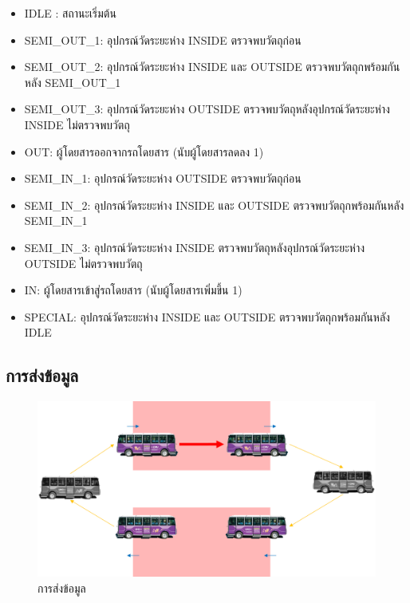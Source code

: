 \begin{itemize}
  \item IDLE : สถานะเริ่มต้น
  \item SEMI\_OUT\_1: อุปกรณ์วัดระยะห่าง INSIDE ตรวจพบวัตถุก่อน
  \item SEMI\_OUT\_2: อุปกรณ์วัดระยะห่าง INSIDE และ OUTSIDE ตรวจพบวัตถุกพร้อมกันหลัง SEMI\_OUT\_1
  \item SEMI\_OUT\_3: อุปกรณ์วัดระยะห่าง OUTSIDE ตรวจพบวัตถุหลังอุปกรณ์วัดระยะห่าง INSIDE ไม่ตรวจพบวัตถุ
  \item OUT: ผู้โดยสารออกจากรถโดยสาร (นับผู้โดยสารลดลง 1)
  \item SEMI\_IN\_1: อุปกรณ์วัดระยะห่าง OUTSIDE ตรวจพบวัตถุก่อน
  \item SEMI\_IN\_2: อุปกรณ์วัดระยะห่าง INSIDE และ OUTSIDE ตรวจพบวัตถุกพร้อมกันหลัง SEMI\_IN\_1
  \item SEMI\_IN\_3: อุปกรณ์วัดระยะห่าง INSIDE ตรวจพบวัตถุหลังอุปกรณ์วัดระยะห่าง OUTSIDE ไม่ตรวจพบวัตถุ
  \item IN: ผู้โดยสารเข้าสู่รถโดยสาร (นับผู้โดยสารเพิ่มขึ้น 1)
  \item SPECIAL: อุปกรณ์วัดระยะห่าง INSIDE และ OUTSIDE ตรวจพบวัตถุกพร้อมกันหลัง IDLE
\end{itemize}



\subsection{การส่งข้อมูล}

\begin{figure}[h!]
  \begin{center}
    \includegraphics[width=1\textwidth]{msg-transmit.png}
  \end{center}
  \caption{การส่งข้อมูล}
  \label{fig:msg-transmit}
\end{figure}

